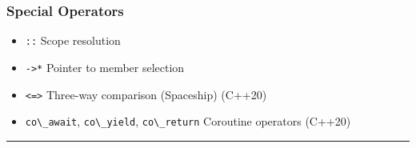 \hypertarget{special-operators}{%
\subsubsection{Special Operators}\label{special-operators}}

\begin{itemize}
\tightlist
\item
  \passthrough{\lstinline!::!} Scope resolution
\item
  \passthrough{\lstinline!->*!} Pointer to member selection
\item
  \passthrough{\lstinline!<=>!} Three-way comparison (Spaceship) (C++20)
\item
  \passthrough{\lstinline!co\_await!},
  \passthrough{\lstinline!co\_yield!},
  \passthrough{\lstinline!co\_return!} Coroutine operators (C++20)
\end{itemize}

\begin{center}\rule{0.5\linewidth}{0.5pt}\end{center}
